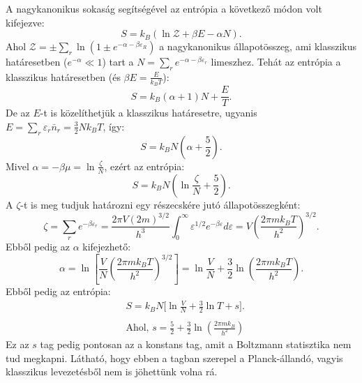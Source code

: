 \documentclass[../main.tex]{subfiles}
\begin{document}
A nagykanonikus sokaság segítségével az entrópia a következő módon volt kifejezve:
\begin{equation}
    S = k_B (\ln \mathcal{Z} + \beta E - \alpha N).
\end{equation}
Ahol $\mathcal{Z} = \pm \sum_r \ln (1 \pm e^{-\alpha - \beta \varepsilon_R })$ a nagykanonikus állapotösszeg, ami klasszikus határesetben ($e^{-\alpha} \ll 1$) tart a 
$N = \sum_r e^{-\alpha - \beta \varepsilon_r}$ limeszhez. Tehát az entrópia a klasszikus határesetben (és $\beta E = \frac{E}{k_B T}$):
\begin{equation}
    S = k_B (\alpha + 1)N + \frac{E}{T}.
\end{equation}
De az $E$-t is közelíthetjük a klasszikus határesetre, ugyanis $E = \sum_r \varepsilon_r \bar{n}_r = \frac{3}{2}N k_B T$, így:
\begin{equation}
    S = k_B N(\alpha + \frac{5}{2}).
\end{equation}
Mivel $\alpha = -\beta \mu = \ln \frac{\zeta}{N}$, ezért az entrópia:
\begin{equation}
    S = k_B N \left( \ln \frac{\zeta}{N} + \frac{5}{2} \right).
\end{equation}
A $\zeta$-t is meg tudjuk határozni egy részecskére jutó állapotösszegként:
\begin{equation}
    \zeta = \sum_r e^{-\beta \varepsilon_r} = \frac{2\pi V (2m)^{3/2}}{h^3} \int_0^{\infty} \varepsilon^{1/2} e^{-\beta \varepsilon} d\varepsilon = V \left( \frac{2 \pi m k_B T}{h^2} \right)^{3/2}.
\end{equation}
Ebből pedig az $\alpha$ kifejezhető:
\begin{equation}
    \alpha = \ln \left[ \frac{V}{N} \left( \frac{2 \pi m k_B T}{h^2} \right)^{3/2} \right] = \ln \frac{V}{N} + \frac{3}{2} \ln \left( \frac{2 \pi m k_B T}{h^2} \right).
\end{equation}
Ebből pedig az entrópia:
\begin{equation}
    \begin{aligned}
        &S = k_B N \Bigg[ \ln \frac{V}{N} + \frac{3}{2} \ln T + s \Bigg]. \\
        \\
        &\text{Ahol, } s = \frac{5}{2} + \frac{3}{2} \ln \left( \frac{2 \pi m k_B}{h^2} \right)
    \end{aligned}
\end{equation}
Ez az $s$ tag pedig pontosan az a konstans tag, amit a Boltzmann statisztika nem tud megkapni. Látható, hogy ebben a tagban szerepel a Planck-állandó, vagyis klasszikus levezetésből nem is jöhettünk volna rá.
\end{document}
